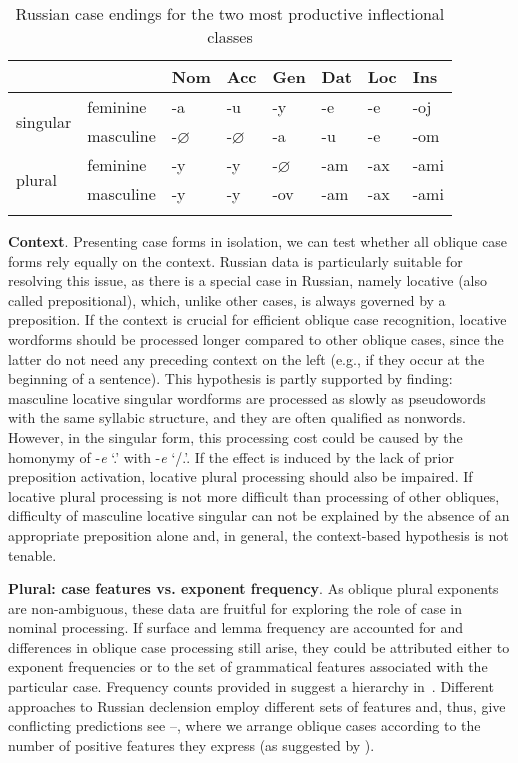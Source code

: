 \documentclass[output=paper, modfonts,newtxmath,hidelinks]{langscibook}
\begin{document}
\begin{table}
    \centering
	\caption{Russian case endings for the two most productive inflectional classes}
    \label{tab:rusDecl}
	\begin{tabular}{*{8}l}
		\lsptoprule
        ~	&	~	&	Nom    &	Acc	 & Gen  &	Dat &	Loc &	Ins	\\
        \midrule
		\multirow{2}{*}{singular} & feminine	&	-a  &	-u	&	-y	&	-e	& -e    &	-oj\\
		&	masculine			&	-$\varnothing$  & -$\varnothing$    &	-a	&	-u	&   -e  &	-om	\\
        \midrule
        \multirow{2}{*}{plural} & feminine	& -y    & -y    &	-$\varnothing$ & -am  & -ax & -ami \\
        &	masculine & -y  & -y &	-ov & -am    & -ax & -ami\\
		\lspbottomrule
    \end{tabular}
\end{table}

\textbf{Context}. Presenting case forms in isolation, we can test whether all oblique case forms  rely equally on the context. Russian data is particularly suitable for resolving this issue, as there is a special case in Russian, namely locative (also called prepositional), which, unlike other cases, is always governed by a preposition. If the context is crucial for efficient oblique case recognition, locative wordforms should be processed longer compared to other oblique cases, since the latter do not need any preceding context on the left (e.g., if they occur at the beginning of a sentence). This hypothesis is partly supported by  finding: masculine locative singular wordforms are processed as slowly as pseudowords with the same syllabic structure, and they are often qualified as nonwords. However, in the singular form, this processing cost could be caused by the homonymy of -\textit{e} `\locc.\masc' with  -\textit{e} `\datt/\locc.\fem'. If the effect is induced by the lack of prior preposition activation, locative plural processing should also be impaired. If locative plural processing is not more difficult than processing of other obliques, difficulty of masculine locative singular can not be explained by the absence of an appropriate preposition alone and, in general, the context-based hypothesis is not tenable. 

\textbf{Plural: case features vs. exponent frequency}. As oblique plural exponents are non-ambiguous, these data are fruitful for exploring the role of case in nominal processing. If surface and lemma frequency are accounted for and differences in oblique case processing still arise, they could be attributed either to exponent frequencies or to the set of grammatical features associated with the particular case. Frequency counts provided in \citet{samojlova2014frequencies} suggest a hierarchy in~. Different approaches to Russian declension employ different sets of features and, thus, give conflicting predictions see --, where we arrange oblique cases according to the number of positive features they express (as suggested by \citealt{clahsen2001mental}).
\end{document}
